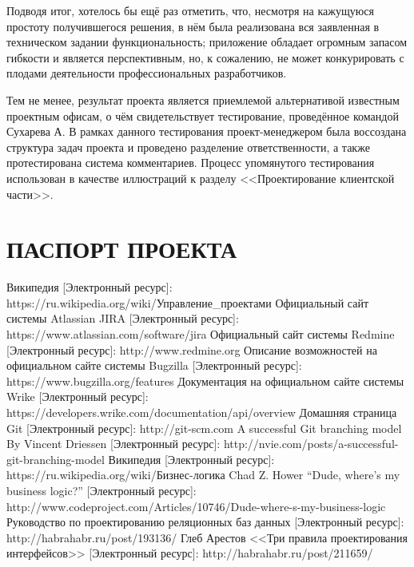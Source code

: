 \documentclass[14pt, a4paper]{extreport}
\begin{document}
Подводя итог, хотелось бы ещё раз отметить, что, несмотря на кажущуюся простоту получившегося решения, в нём была реализована вся заявленная в техническом задании функциональность; приложение обладает огромным запасом гибкости и является перспективным, но, к сожалению, не может конкурировать с плодами деятельности профессиональных разработчиков.

Тем не менее, результат проекта является приемлемой альтернативой известным проектным офисам, о чём свидетельствует тестирование, проведённое командой Сухарева А. В рамках данного тестирования проект-менеджером была воссоздана структура задач проекта и проведено разделение ответственности, а также протестирована система комментариев. Процесс упомянутого тестирования использован в качестве иллюстраций к разделу <<Проектирование клиентской части>>.


\chapter{\MakeTextUppercase{Паспорт проекта}}





\newpage


\begin{thebibliography}{}
 Википедия [Электронный ресурс]: \\https://ru.wikipedia.org/wiki/Управление\_проектами
 Официальный сайт системы Atlassian JIRA [Электронный ресурс]: https://www.atlassian.com/software/jira
 Официальный сайт системы Redmine [Электронный ресурс]: http://www.redmine.org
 Описание возможностей на официальном сайте системы Bugzilla [Электронный ресурс]: https://www.bugzilla.org/features
 Документация на официальном сайте системы Wrike [Электронный ресурс]: https://developers.wrike.com/documentation/api/overview
 Домашняя страница Git [Электронный ресурс]: http://git-scm.com
 A successful Git branching model By Vincent Driessen [Электронный ресурс]: http://nvie.com/posts/a-successful-git-branching-model
\bibitem{} Википедия [Электронный ресурс]: \\https://ru.wikipedia.org/wiki/Бизнес-логика
\bibitem{} Chad Z. Hower ``Dude, where's my business logic?'' [Электронный ресурс]: http://www.codeproject.com/Articles/10746/Dude-where-s-my-business-logic
\bibitem{} Руководство по проектированию реляционных баз данных [Электронный ресурс]: http://habrahabr.ru/post/193136/
\bibitem{} Глеб Арестов <<Три правила проектирования интерфейсов>> [Электронный ресурс]: http://habrahabr.ru/post/211659/
\end{thebibliography}
\end{document}
